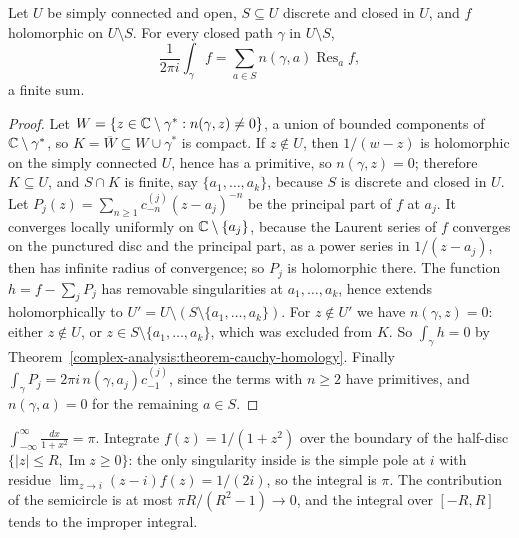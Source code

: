 \begin{theorem}\label{complex-analysis:theorem-residues}
Let $U$ be simply connected and open, $S \subseteq U$ discrete and closed in $U$, and $f$ holomorphic on $U \setminus S$. For every closed path $\gamma$ in $U \setminus S$,
\[
\frac{1}{2\pi i}\int_\gamma f = \sum_{a \in S}n(\gamma, a)\operatorname{Res}_af,
\]
a finite sum.
\end{theorem}

\begin{proof}
Let $W = \{z \in \mathbb{C} \setminus \gamma^* : n(\gamma, z) \neq 0\}$, a union of bounded components of $\mathbb{C} \setminus \gamma^*$, so $K = \overline{W} \subseteq W \cup \gamma^*$ is compact. If $z \notin U$, then $1/(w - z)$ is
holomorphic on the simply connected $U$, hence has a primitive, so $n(\gamma, z) = 0$; therefore $K \subseteq U$, and $S \cap K$ is finite, say $\{a_1, \ldots, a_k\}$, because $S$ is discrete and closed in $U$.
Let $P_j(z) = \sum_{n \geq 1}c^{(j)}_{-n}(z - a_j)^{-n}$ be the principal part of $f$ at $a_j$. It converges locally uniformly on $\mathbb{C} \setminus \{a_j\}$, because the Laurent series of $f$ converges on the
punctured disc and the principal part, as a power series in $1/(z - a_j)$, then has infinite radius of convergence; so $P_j$ is holomorphic there. The function $h = f - \sum_jP_j$ has removable
singularities at $a_1, \ldots, a_k$, hence extends holomorphically to $U' = U \setminus (S \setminus \{a_1, \ldots, a_k\})$. For $z \notin U'$ we have $n(\gamma, z) = 0$: either $z \notin U$, or
$z \in S \setminus \{a_1, \ldots, a_k\}$, which was excluded from $K$. So $\int_\gamma h = 0$ by Theorem~\ref{complex-analysis:theorem-cauchy-homology}. Finally
$\int_\gamma P_j = 2\pi i\,n(\gamma, a_j)c^{(j)}_{-1}$, since the terms with $n \geq 2$ have primitives, and $n(\gamma, a) = 0$ for the remaining $a \in S$.
\end{proof}

\begin{example}\label{complex-analysis:example-residue-computation}
$\int_{-\infty}^{\infty}\frac{dx}{1 + x^2} = \pi$. Integrate $f(z) = 1/(1 + z^2)$ over the boundary of the half-disc $\{|z| \leq R, \operatorname{Im}z \geq 0\}$: the only singularity inside is the simple pole
at $i$ with residue $\lim_{z \to i}(z - i)f(z) = 1/(2i)$, so the integral is $\pi$. The contribution of the semicircle is at most $\pi R/(R^2 - 1) \to 0$, and the integral over $[-R, R]$ tends to the
improper integral.
\end{example}

